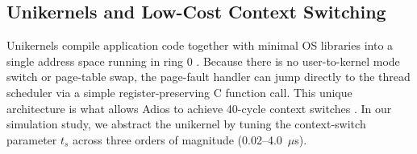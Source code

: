 \subsection{Unikernels and Low-Cost Context Switching}
Unikernels compile application code together with minimal OS libraries into a single address space running in ring 0 \cite{unikernels,osv,unikraft,ukl}. Because there is no user-to-kernel mode switch or page-table swap, the page-fault handler can jump directly to the thread scheduler via a simple register-preserving C function call. This unique architecture is what allows Adios to achieve 40-cycle context switches \cite{adios}. In our simulation study, we abstract the unikernel by tuning the context-switch parameter $t_s$ across three orders of magnitude (0.02--4.0~$\mu$s).
